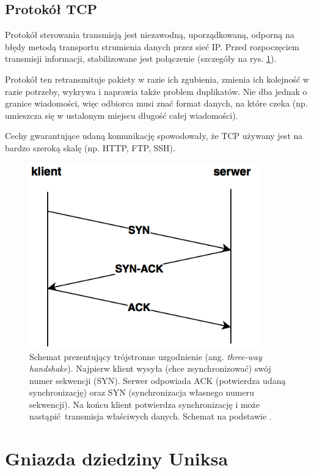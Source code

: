 \subsection{Protokół TCP}
\label{TCP}

Protokół sterowania transmisją jest niezawodną, uporządkowaną, odporną na błędy metodą transportu strumienia danych przez sieć IP. Przed rozpoczęciem transmisji informacji, stabilizowane jest połączenie \cite{TCP_RFC} (szczegóły na rys. \ref{fig:TCP_handshake}).

Protokół ten retransmituje pakiety w razie ich zgubienia, zmienia ich kolejność w razie potrzeby, wykrywa i naprawia także problem duplikatów. Nie dba jednak o granice wiadomości, więc odbiorca musi znać format danych, na które czeka (np. umieszcza się w ustalonym miejscu długość całej wiadomości).

Cechy gwarantujące udaną komunikację spowodowały, że TCP używany jest na bardzo szeroką skalę (np. HTTP, FTP, SSH).

\begin{figure}[H]
    \centering
    \includegraphics[height=8cm,keepaspectratio]{img/TCP_handshake.png}
    \caption{Schemat prezentujący trójstronne uzgodnienie (ang. \textit{three-way handshake}). Najpierw klient wysyła (chce zsynchronizować) swój numer sekwencji (SYN). Serwer odpowiada ACK (potwierdza udaną synchronizację) oraz SYN (synchronizacja własnego numeru sekwencji). Na końcu klient potwierdza synchronizację i może nastąpić transmisja właściwych danych. Schemat na podstawie \cite{TCPIP_guide}.}
    \label{fig:TCP_handshake}
\end{figure}


\section{Gniazda dziedziny Uniksa}

